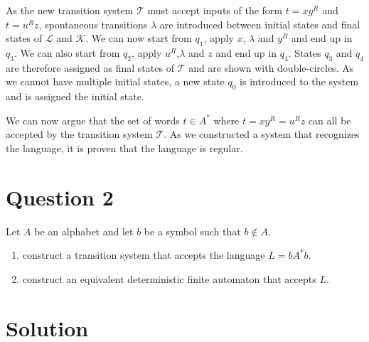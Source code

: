 As the new transition system $\mathcal{T}$ must accept inputs of the form $t = xy^R$ and $t = u^Rz$, spontaneous transitions $\lambda$ are introduced between initial states and final states of $\mathcal{L}$ and $\mathcal{K}$.
We can now start from $q_1$, apply $x$, $\lambda$ and $y^R$ and end up in $q_3$.
We can also start from $q_2$, apply $u^R$,$\lambda$ and $z$ and end up in $q_4$.
States $q_3$ and $q_4$ are therefore assigned as final states of $\mathcal{T}$ and are shown with double-circles.
As we cannot have multiple initial states, a new state $q_0$ is introduced to the system and is assigned the initial state.

We can now argue that the set of words $t \in A^*$ where $t = xy^R = u^Rz$ can all be accepted by the transition system $\mathcal{T}$.
As we constructed a system that recognizes the language, it is proven that the language is regular.

\section*{Question 2}

Let $A$ be an alphabet and let $b$ be a symbol such that $b \notin A$.

\begin{enumerate}[label=(\alph*)]
	\item construct a transition system that accepts the language $ L = b A^* b $.
	\item construct an equivalent deterministic finite automaton that accepts $L$.
\end{enumerate}

\section*{Solution}

